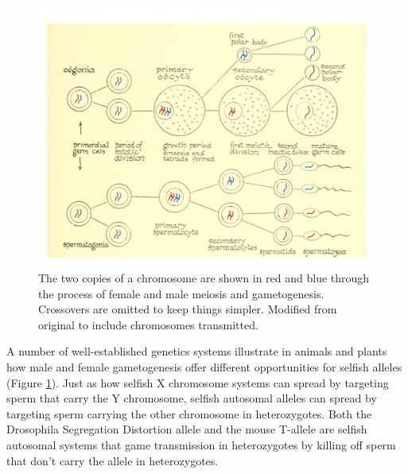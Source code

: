 {  \begin{figure}
\begin{center}
\includegraphics[width= \textwidth]{illustration_images/single_locus_selection/gametogenesis_male_female/gametogenesis_w_chr.pdf}
\end{center}
\caption{
   The two copies of a chromosome are shown in red and blue through
   the process of female and male meiosis and gametogenesis.  Crossovers are omitted to keep things simpler. 
Modified from original to include chromosomes transmitted.
   } \label{fig:gametogenesis_male_female}
\end{figure}  %


A number of well-established genetics systems illustrate in
animals and plants how male and female gametogenesis offer different
opportunities for selfish alleles (Figure \ref{fig:gametogenesis_male_female}). Just as how selfish X chromosome systems can spread by
targeting sperm that carry the Y chromosome, selfish autosomal alleles
can spread by targeting sperm carrying the other chromosome in
heterozygotes. Both the Drosophila Segregation Distortion allele and
the mouse T-allele are selfish autosomal systems that
game transmission in heterozygotes by killing off sperm that don't carry the allele in heterozygotes.


}
